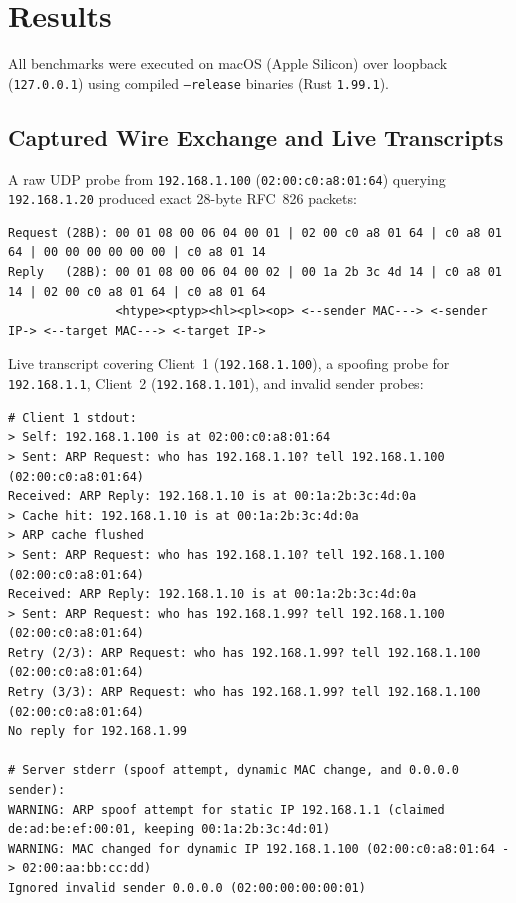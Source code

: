 \documentclass[11pt,a4paper]{article}
\begin{document}
\section{Results}

All benchmarks were executed on macOS (Apple Silicon) over loopback (\texttt{127.0.0.1}) using compiled \texttt{--release} binaries (Rust \texttt{1.99.1}).

\subsection{Captured Wire Exchange and Live Transcripts}
A raw UDP probe from \texttt{192.168.1.100} (\texttt{02:00:c0:a8:01:64}) querying \texttt{192.168.1.20} produced exact 28-byte RFC~826 packets:
\begin{lstlisting}[style=plain]
Request (28B): 00 01 08 00 06 04 00 01 | 02 00 c0 a8 01 64 | c0 a8 01 64 | 00 00 00 00 00 00 | c0 a8 01 14
Reply   (28B): 00 01 08 00 06 04 00 02 | 00 1a 2b 3c 4d 14 | c0 a8 01 14 | 02 00 c0 a8 01 64 | c0 a8 01 64
               <htype><ptyp><hl><pl><op> <--sender MAC---> <-sender IP-> <--target MAC---> <-target IP->
\end{lstlisting}

Live transcript covering Client~1 (\texttt{192.168.1.100}), a spoofing probe for \texttt{192.168.1.1}, Client~2 (\texttt{192.168.1.101}), and invalid sender probes:
\begin{lstlisting}[style=plain]
# Client 1 stdout:
> Self: 192.168.1.100 is at 02:00:c0:a8:01:64
> Sent: ARP Request: who has 192.168.1.10? tell 192.168.1.100 (02:00:c0:a8:01:64)
Received: ARP Reply: 192.168.1.10 is at 00:1a:2b:3c:4d:0a
> Cache hit: 192.168.1.10 is at 00:1a:2b:3c:4d:0a
> ARP cache flushed
> Sent: ARP Request: who has 192.168.1.10? tell 192.168.1.100 (02:00:c0:a8:01:64)
Received: ARP Reply: 192.168.1.10 is at 00:1a:2b:3c:4d:0a
> Sent: ARP Request: who has 192.168.1.99? tell 192.168.1.100 (02:00:c0:a8:01:64)
Retry (2/3): ARP Request: who has 192.168.1.99? tell 192.168.1.100 (02:00:c0:a8:01:64)
Retry (3/3): ARP Request: who has 192.168.1.99? tell 192.168.1.100 (02:00:c0:a8:01:64)
No reply for 192.168.1.99

# Server stderr (spoof attempt, dynamic MAC change, and 0.0.0.0 sender):
WARNING: ARP spoof attempt for static IP 192.168.1.1 (claimed de:ad:be:ef:00:01, keeping 00:1a:2b:3c:4d:01)
WARNING: MAC changed for dynamic IP 192.168.1.100 (02:00:c0:a8:01:64 -> 02:00:aa:bb:cc:dd)
Ignored invalid sender 0.0.0.0 (02:00:00:00:00:01)
\end{lstlisting}
\end{document}
